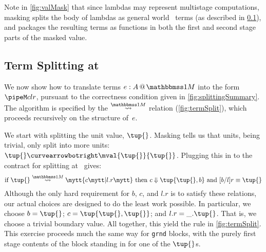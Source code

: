 \begin{abstrsyn}
Note in \ref{fig:valMask} that since lambdas may represent multistage
computations, masking splits the body of lambdas as general world
\bbonem\ terms (as described in \ref{sec:split-one}), and packages the
resulting terms as functions in both the first and second stage parts
of the masked value.



\subsection{Term Splitting at \bbonem}
\label{sec:split-one}

We now show how to translate terms $\colmix e A$ into the form $\pipeM c l r$,
pursuant to the correctness condition given in \ref{fig:splittingSummary}.
The algorithm is specified by the $\splitonesym$ relation (\cref{fig:termSplit}), 
which proceeds recursively on the structure of~$e$.

We start with splitting the unit value, $\tup{}$.
Masking tells us that units, being trivial, only split into more units: $\tup{} \vsplito \mval {\tup{}} {\tup{}}$.
Plugging this in to the contract for splitting at \bbonem\ gives:
\[
	\text{if } \splitone {\tup {}} A c {l.r} \text{ then } \reduce c {\tup{\tup{},b}} \text{ and } [b/l]r \equiv \tup{}
\]
Although the only hard requirement for $b$, $c$, and $l.r$ is to satisfy these relations,
our actual choices are designed to do the least work possible.
In particular, we choose $b = \tup{}$; $c=\tup{\tup{},\tup{}}$; and $l.r = \_.\tup{}$.
That is, we choose a trivial boundary value.
All together, this yield the rule in \cref{fig:termSplit}.
This exercise proceeds much the same way for \texttt{grnd} blocks, 
with the purely first stage contents of the block standing in for one of the $\tup{}$s.


\end{abstrsyn}
